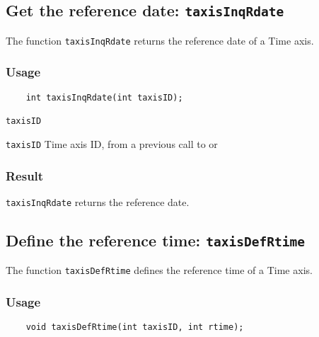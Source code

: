 \subsection{Get the reference date: \texttt{taxisInqRdate}}
\label{taxisInqRdate}

The function {\texttt{taxisInqRdate}} returns the reference date of a Time axis.

\subsubsection*{Usage}

\begin{verbatim}
    int taxisInqRdate(int taxisID);
\end{verbatim}

\hspace*{4mm}\begin{minipage}[]{15cm}
\begin{deflist}{\texttt{taxisID}\ }
\item[\texttt{taxisID}]
Time axis ID, from a previous call to {} or {}

\end{deflist}
\end{minipage}

\subsubsection*{Result}

{\texttt{taxisInqRdate}} returns the reference date.



\subsection{Define the reference time: \texttt{taxisDefRtime}}
\label{taxisDefRtime}

The function {\texttt{taxisDefRtime}} defines the reference time of a Time axis.

\subsubsection*{Usage}

\begin{verbatim}
    void taxisDefRtime(int taxisID, int rtime);
\end{verbatim}

